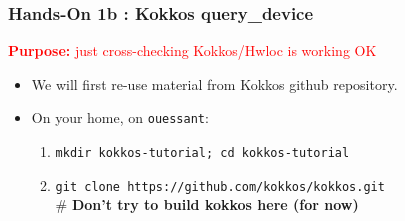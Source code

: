 \begin{frame}
  \frametitle{Hands-On 1b : Kokkos query\_device}

  {\large\textcolor{red}{\textbf{Purpose:} just cross-checking Kokkos/Hwloc is working OK}}

  \begin{itemize}
  \item We will first re-use material from Kokkos github repository.
  \item On your home, on \texttt{ouessant}: 
    \begin{enumerate}
    \item \texttt{mkdir kokkos-tutorial; cd kokkos-tutorial}
    \item \texttt{git clone https://github.com/kokkos/kokkos.git} \\
      \# \textbf{Don't try to build kokkos here (for now)}
    \end{enumerate}
  \end{itemize}

\end{frame}

